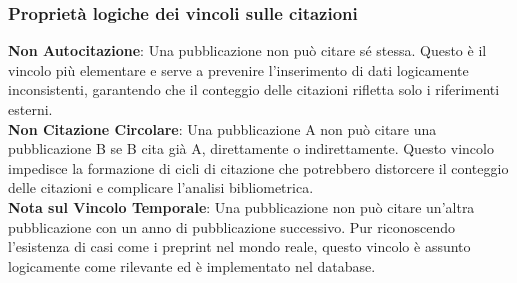 \documentclass[a4paper,12pt]{article}
\begin{document}
\subsubsection*{Proprietà logiche dei vincoli sulle citazioni}
\textbf{Non Autocitazione}: Una pubblicazione non può citare sé stessa. Questo è il vincolo più elementare e serve a prevenire l'inserimento di dati logicamente inconsistenti, garantendo che il conteggio delle citazioni rifletta solo i riferimenti esterni.\\
\textbf{Non Citazione Circolare}: Una pubblicazione A non può citare una pubblicazione B se B cita già A, direttamente o indirettamente. Questo vincolo impedisce la formazione di cicli di citazione che potrebbero distorcere il conteggio delle citazioni e complicare l'analisi bibliometrica.\\
\textbf{Nota sul Vincolo Temporale}: Una pubblicazione non può citare un'altra pubblicazione con un anno di pubblicazione successivo. Pur riconoscendo l'esistenza di casi come i preprint nel mondo reale, questo vincolo è assunto logicamente come rilevante ed è implementato nel database.\\
\end{document}

